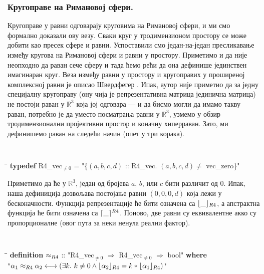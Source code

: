 \subsubsection{Кругоправе на Римановој сфери.}

Кругоправе у равни одговарају круговима на Римановој сфери, и ми смо
формално доказали ову везу. Сваки круг у тродимензионом простору се
може добити као пресек сфере и равни. Успоставили смо један-на-један
пресликавање између кругова на Римановој сфери и равни у
простору. Приметимо и да није неопходно да раван сече сферу и тада
ћемо рећи да она дефинише јединствен имагинаран круг. Веза између
равни у простору и кругоправих у проширеној комплексној равни је
описао Швердфегер \cite{schwerdtfeger}. Ипак, аутор није приметио
да за једну специјалну кругоправу (ону чија је репрезентативна матрица
јединична матрица) не постоји раван у $\mathbb{R}^3$ која јој одговара
--- и да бисмо могли да имамо такву раван, потребно је да уместо
посматрања равни у $\mathbb{R}^3$, узмемо у обзир тродимензионални
пројективни простор и коначну хиперраван. Зато, ми дефинишемо раван на
следећи начин (опет у три корака).

{\tt
\begin{tabbing}
\hspace{5mm}\=\hspace{5mm}\=\hspace{5mm}\=\hspace{5mm}\=\hspace{5mm}\=\kill
\textbf{typedef} R4\_vec$_{\neq 0}$ = "\{$(a, b, c, d)$ :: R4\_vec. $(a, b, c, d) \neq$ vec\_zero\}"
\end{tabbing}
}

Приметимо да ће у $\mathbb{R}^3$, један од бројева $a$, $b$, или $c$
бити различит од $0$. Ипак, наша дефиниција дозвољава постојање равни
$(0, 0, 0, d)$ која лежи у бесконачности. Функција репрезентације ће
бити означена са $\lfloor\_\rfloor_{R4}$, а апстрактна функција ће бити означена
са $\lceil\_\rceil^{R4}$. Поново, две равни су еквивалентне акко су
пропорционалне (овог пута за неки ненула реални фактор).   {\tt
\begin{tabbing}
\hspace{5mm}\=\hspace{5mm}\=\hspace{5mm}\=\hspace{5mm}\=\hspace{5mm}\=\kill
\textbf{definition} $\approx_{R4}$ :: "R4\_vec$_{\neq 0}$ $\Rightarrow$ R4\_vec$_{\neq 0}$ $\Rightarrow$ bool" \textbf{where}\\
\>"$\alpha_1 \approx_{R4} \alpha_2 \longleftrightarrow (\exists k.\ k \neq 0 \wedge \lfloor\alpha_2\rfloor_{R4} = k*\lfloor\alpha_1\rfloor_{R4})$"
\end{tabbing}
}

